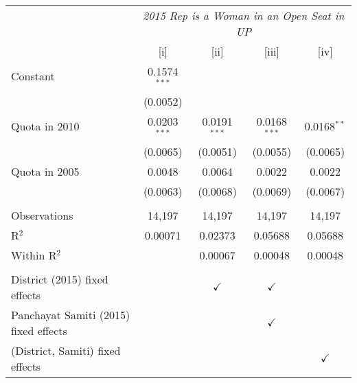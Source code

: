 
\begingroup
\centering
\begin{tabular}{lcccc}
   \toprule
    & \multicolumn{4}{c}{\textit{2015 Rep is a Woman in an Open Seat in UP}}\\
                                         & [i]            & [ii]           & [iii]          & [iv]\\  
   \midrule 
   Constant                              & 0.1574$^{***}$ &                &                &   \\   
                                         & (0.0052)       &                &                &   \\   
   Quota in 2010                         & 0.0203$^{***}$ & 0.0191$^{***}$ & 0.0168$^{***}$ & 0.0168$^{**}$\\   
                                         & (0.0065)       & (0.0051)       & (0.0055)       & (0.0065)\\   
   Quota in 2005                         & 0.0048         & 0.0064         & 0.0022         & 0.0022\\   
                                         & (0.0063)       & (0.0068)       & (0.0069)       & (0.0067)\\   
    \\
   Observations                          & 14,197         & 14,197         & 14,197         & 14,197\\  
   R$^2$                                 & 0.00071        & 0.02373        & 0.05688        & 0.05688\\  
   Within R$^2$                          &                & 0.00067        & 0.00048        & 0.00048\\  
    \\
   District (2015) fixed effects         &                & $\checkmark$   & $\checkmark$   & \\  
   Panchayat Samiti (2015) fixed effects &                &                & $\checkmark$   & \\  
   (District, Samiti) fixed effects      &                &                &                & $\checkmark$\\   
   \bottomrule
\end{tabular}
\par\endgroup


